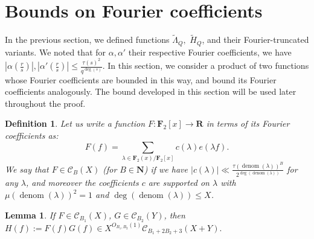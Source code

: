 \documentclass[11pt, reqno]{amsart}
\newtheorem{lemma}[theorem]{Lemma}
\newtheorem*{definition}{Definition}
\numberwithin{equation}{section}
\newcommand{\zff}{\mathbf{F}_2[x]}
\newcommand\denom{\operatorname{denom}}
\begin{document}
\section{Bounds on Fourier coefficients}
\label{section_fourier_bounds}

In the previous section, we defined functions $\widetilde{\Lambda}_Q,$ $\widetilde{H}_Q$, and their Fourier-truncated variants. We noted that for $\alpha, \alpha'$ their respective Fourier coefficients, we have $|\alpha(\frac{r}{s})|, |\alpha'(\frac{r}{s})| \leqslant \frac{\tau(s)^2}{q^{\deg(s)}}$. In this section, we consider a product of two functions whose Fourier coefficients are bounded in this way, and bound its Fourier coefficients analogously. The bound developed in this section will be used later throughout the proof.

\begin{definition}
    Let us write a function $F: \zff \rightarrow \mathbf{R}$ in terms of its Fourier coefficients as: $$F(f)=\sum_{\lambda \in \mathbf{F}_2(x) / \zff} c(\lambda)e(\lambda f).$$ We say that $F \in \mathcal{C}_B(X)$ (for $B \in \mathbf{N}$) if we have $|c(\lambda)| \ll \frac{\tau(\denom(\lambda))^B}{2^{\deg(\denom(\lambda))}}$ for any $\lambda$, and moreover the coefficients $c$ are supported on $\lambda$ with $\mu(\denom(\lambda))^2=1$ and $\deg(\denom(\lambda)) \leqslant X$.
\end{definition}

\begin{lemma}
\label{original_4_2}
    If $F \in \mathcal{C}_{B_1}(X)$, $G \in \mathcal{C}_{B_2}(Y)$, then $H(f):=F(f)G(f) \in X^{O_{B_1, B_2}(1)} \mathcal{C}_{B_1+2B_2+3}(X+Y).$
\end{lemma}
\end{document}
